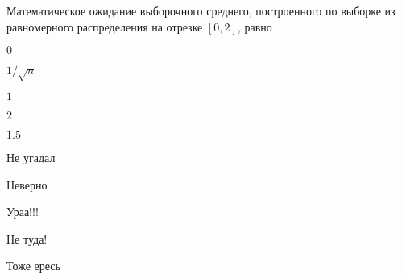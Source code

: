 
\begin{question}
Математическое ожидание выборочного среднего, построенного по выборке из
равномерного распределения на отрезке \([0,2]\), равно
\begin{answerlist}
  \item \(0\)
  \item \(1/\sqrt{n}\)
  \item \(1\)
  \item \(2\)
  \item \(1.5\)
\end{answerlist}
\end{question}

\begin{solution}
\begin{answerlist}
  \item Не угадал
  \item Неверно
  \item Ураа!!!
  \item Не туда!
  \item Тоже ересь
\end{answerlist}
\end{solution}

